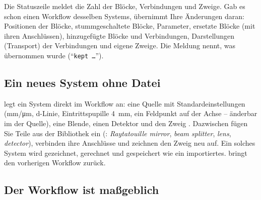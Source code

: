 Die Statuszeile meldet die Zahl der Blöcke, Verbindungen und Zweige. Gab es schon einen Workflow
desselben Systems, übernimmt  Ihre Änderungen daran: Positionen der
Blöcke, stummgeschaltete Blöcke, Parameter, ersetzte Blöcke (mit ihren Anschlüssen),
hinzugefügte Blöcke und Verbindungen, Darstellungen (Transport) der Verbindungen und eigene
Zweige. Die Meldung nennt, was übernommen wurde (\enquote{\texttt{kept …}}).

\subsection{Ein neues System ohne Datei}

 legt ein System direkt im Workflow an: eine Quelle mit
Standardeinstellungen (mm/\si{\micro\metre}, d-Linie, Eintrittspupille \SI{4}{\milli\metre},
ein Feldpunkt auf der Achse -- änderbar im  der Quelle), eine Blende, einen
Detektor und den Zweig . Dazwischen fügen Sie Teile aus der Bibliothek ein
(: \emph{Raytatouille mirror}, \emph{beam splitter}, \emph{lens},
\emph{detector}), verbinden ihre Anschlüsse und zeichnen den Zweig neu auf. Ein solches System
wird gezeichnet, gerechnet und gespeichert wie ein importiertes.  bringt den
vorherigen Workflow zurück.

\subsection{Der Workflow ist maßgeblich}

